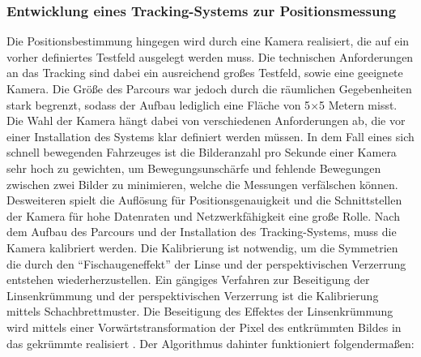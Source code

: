 \subsubsection{Entwicklung eines Tracking-Systems zur Positionsmessung}
Die Positionsbestimmung hingegen wird durch eine Kamera realisiert, die auf ein vorher definiertes Testfeld ausgelegt werden muss. Die technischen Anforderungen an das Tracking sind dabei ein ausreichend großes Testfeld, sowie eine geeignete Kamera. Die Größe des Parcours war jedoch durch die räumlichen Gegebenheiten stark begrenzt, sodass der Aufbau lediglich eine Fläche von 5$\times$5 Metern misst. Die Wahl der Kamera hängt dabei von verschiedenen Anforderungen ab, die vor einer Installation des Systems klar definiert werden müssen. In dem Fall eines sich schnell bewegenden Fahrzeuges ist die Bilderanzahl pro Sekunde einer Kamera sehr hoch zu gewichten, um Bewegungsunschärfe und fehlende Bewegungen zwischen zwei Bilder zu minimieren, welche die Messungen verfälschen können. Desweiteren spielt die Auflösung für Positionsgenauigkeit und die Schnittstellen der Kamera für hohe Datenraten und Netzwerkfähigkeit eine große Rolle. Nach dem Aufbau des Parcours und der Installation des Tracking-Systems, muss die Kamera kalibriert werden. Die Kalibrierung ist notwendig, um die Symmetrien die durch den "`Fischaugeneffekt"' der Linse und der perspektivischen Verzerrung entstehen wiederherzustellen. Ein gängiges Verfahren zur Beseitigung der Linsenkrümmung und der perspektivischen Verzerrung ist die Kalibrierung mittels Schachbrettmuster. Die Beseitigung des Effektes der Linsenkrümmung wird mittels einer Vorwärtstransformation der Pixel des entkrümmten Bildes in das gekrümmte realisiert \cite{Zhang}. Der Algorithmus dahinter funktioniert folgendermaßen:\par\medskip
